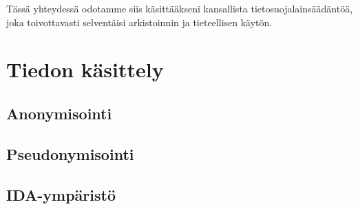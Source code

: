 \documentclass[]{book}
\begin{document}
Tässä yhteydessä odotamme siis käsittääkseni kansallista
tietosuojalainsäädäntöä, joka toivottavasti selventäisi arkistoinnin ja
tieteellisen käytön.

\hypertarget{tiedon-kasittely}{%
\chapter{Tiedon käsittely}\label{tiedon-kasittely}}

\hypertarget{anonymisointi}{%
\section{Anonymisointi}\label{anonymisointi}}

\hypertarget{pseudonymisointi}{%
\section{Pseudonymisointi}\label{pseudonymisointi}}

\hypertarget{ida-ymparisto}{%
\section{IDA-ympäristö}\label{ida-ymparisto}}


\end{document}
